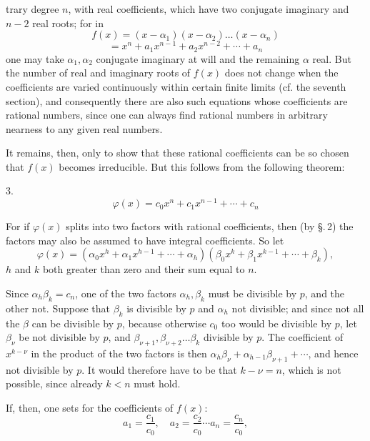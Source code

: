 trary degree $n$, with real coefficients, which have two conjugate imaginary and $n - 2$ real roots; for in
\[
f(x) = (x - \alpha_1)(x - \alpha_2) \ldots (x - \alpha_n)
\]
\[
= x^n + a_1 x^{n-1} + a_2 x^{n-2} + \cdots + a_n
\]
one may take $\alpha_1, \alpha_2$ conjugate imaginary at will and the remaining $\alpha$ real. But the number of real and imaginary roots of $f(x)$ does not change when the coefficients are varied continuously within certain finite limits (cf. the seventh section), and consequently there are also such equations whose coefficients are rational numbers, since one can always find rational numbers in arbitrary nearness to any given real numbers.

It remains, then, only to show that these rational coefficients can be so chosen that $f(x)$ becomes irreducible. But this follows from the following theorem:

3. 
\[
\varphi(x) = c_0 x^n + c_1 x^{n-1} + \cdots + c_n
\]

For if $\varphi(x)$ splits into two factors with rational coefficients, then (by \S.\,2) the factors may also be assumed to have integral coefficients. So let
\[
\varphi(x) = (\alpha_0 x^h + \alpha_1 x^{h-1} + \cdots + \alpha_h)(\beta_0 x^k + \beta_1 x^{k-1} + \cdots + \beta_k),
\]
$h$ and $k$ both greater than zero and their sum equal to $n$.

Since $\alpha_h \beta_k = c_n$, one of the two factors $\alpha_h, \beta_k$ must be divisible by $p$, and the other not. Suppose that $\beta_k$ is divisible by $p$ and $\alpha_h$ not divisible; and since not all the $\beta$ can be divisible by $p$, because otherwise $c_0$ too would be divisible by $p$, let $\beta_\nu$ be not divisible by $p$, and $\beta_{\nu+1}, \beta_{\nu+2} \ldots \beta_k$ divisible by $p$. The coefficient of $x^{k-\nu}$ in the product of the two factors is then $\alpha_h \beta_\nu + \alpha_{h-1}\beta_{\nu+1} + \cdots$, and hence not divisible by $p$. It would therefore have to be that $k - \nu = n$, which is not possible, since already $k < n$ must hold.

If, then, one sets for the coefficients of $f(x)$:
\[
a_1 = \frac{c_1}{c_0}, \quad a_2 = \frac{c_2}{c_0} \cdots a_n = \frac{c_n}{c_0},
\]
